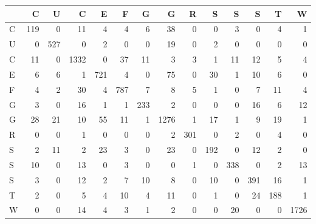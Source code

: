 \begin{tabular}{lrrrrrrrrrrrrr}
\toprule
{} &    C &    U &     C &    E &    F &    G &     G &    R &    S &    S &    S &    T &     W \\
\midrule
C &  119 &    0 &    11 &    4 &    4 &    6 &    38 &    0 &    0 &    3 &    0 &    4 &     1 \\
U &    0 &  527 &     0 &    2 &    0 &    0 &    19 &    0 &    2 &    0 &    0 &    0 &     0 \\
C &   11 &    0 &  1332 &    0 &   37 &   11 &     3 &    3 &    1 &   11 &   12 &    5 &     4 \\
E &    6 &    6 &     1 &  721 &    4 &    0 &    75 &    0 &   30 &    1 &   10 &    6 &     0 \\
F &    4 &    2 &    30 &    4 &  787 &    7 &     8 &    5 &    1 &    0 &    7 &   11 &     4 \\
G &    3 &    0 &    16 &    1 &    1 &  233 &     2 &    0 &    0 &    0 &   16 &    6 &    12 \\
G &   28 &   21 &    10 &   55 &   11 &    1 &  1276 &    1 &   17 &    1 &    9 &   19 &     1 \\
R &    0 &    0 &     1 &    0 &    0 &    0 &     2 &  301 &    0 &    2 &    0 &    4 &     0 \\
S &    2 &   11 &     2 &   23 &    3 &    0 &    23 &    0 &  192 &    0 &   12 &    2 &     0 \\
S &   10 &    0 &    13 &    0 &    3 &    0 &     0 &    1 &    0 &  338 &    0 &    2 &    13 \\
S &    3 &    0 &    12 &    2 &    7 &   10 &     8 &    0 &   10 &    0 &  391 &   16 &     1 \\
T &    2 &    0 &     5 &    4 &   10 &    4 &    11 &    0 &    1 &    0 &   24 &  188 &     1 \\
W &    0 &    0 &    14 &    4 &    3 &    1 &     2 &    0 &    0 &   20 &    0 &    0 &  1726 \\
\bottomrule
\end{tabular}
